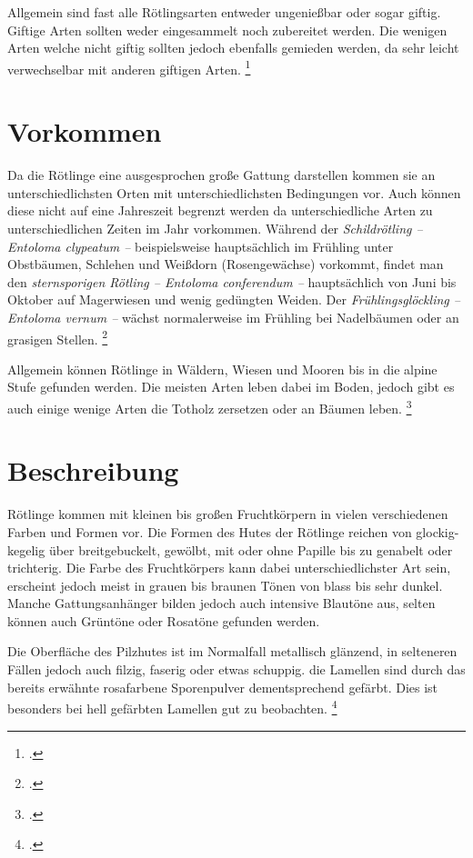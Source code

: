 \documentclass[a4paper,abstracton]{scrreprt}
\begin{document}
Allgemein sind fast alle Rötlingsarten entweder ungenießbar oder sogar giftig. Giftige Arten sollten weder eingesammelt noch zubereitet werden. Die wenigen Arten welche nicht giftig sollten jedoch ebenfalls gemieden werden, da sehr leicht verwechselbar mit anderen giftigen Arten. \footcite{kosmos}

\section{Vorkommen}
Da die Rötlinge eine ausgesprochen große Gattung darstellen kommen sie an unterschiedlichsten Orten mit unterschiedlichsten Bedingungen vor. Auch können diese nicht auf eine Jahreszeit begrenzt werden da unterschiedliche Arten zu unterschiedlichen Zeiten im Jahr vorkommen. Während der \emph{Schildrötling -- Entoloma clypeatum --} beispielsweise hauptsächlich im Frühling unter Obstbäumen, Schlehen und Weißdorn (Rosengewächse) vorkommt, findet man den \emph{sternsporigen Rötling -- Entoloma conferendum --} hauptsächlich von Juni bis Oktober auf Magerwiesen und wenig gedüngten Weiden. Der \emph{Frühlingsglöckling -- Entoloma vernum --} wächst normalerweise im Frühling bei Nadelbäumen oder an grasigen Stellen. \footcite{naturfuehrer} 

Allgemein können Rötlinge in Wäldern, Wiesen und Mooren bis in die alpine Stufe gefunden werden. Die meisten Arten leben dabei im Boden, jedoch gibt es auch einige wenige Arten die Totholz zersetzen oder an Bäumen leben. \footcite{faktenuber}

\section{Beschreibung}
Rötlinge kommen mit kleinen bis großen Fruchtkörpern in vielen verschiedenen Farben und Formen vor. Die Formen des Hutes der Rötlinge reichen von glockig-kegelig über breitgebuckelt, gewölbt, mit oder ohne Papille bis zu genabelt oder trichterig. Die Farbe des Fruchtkörpers kann dabei unterschiedlichster Art sein, erscheint jedoch meist in grauen bis braunen Tönen von blass bis sehr dunkel. Manche Gattungsanhänger bilden jedoch auch intensive Blautöne aus, selten können auch Grüntöne oder Rosatöne gefunden werden. 

Die Oberfläche des Pilzhutes ist im Normalfall metallisch glänzend, in selteneren Fällen jedoch auch filzig, faserig oder etwas schuppig. die Lamellen sind durch das bereits erwähnte rosafarbene Sporenpulver dementsprechend gefärbt. Dies ist besonders bei hell gefärbten Lamellen gut zu beobachten.
\footcite{beschreibung}
\end{document}
